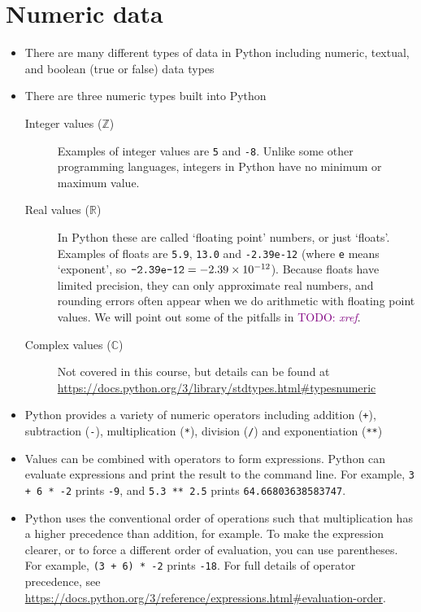\documentclass[a4paper,twoside]{memoir}
\newcommand{\shellcmd}{\texttt}
\newcommand{\TODO}[1]{\textcolor{purple}{TODO: \emph{#1}}}
\begin{document}
\section{Numeric data}
\begin{itemize}
\item There are many different types of data in Python including numeric, textual, and boolean (true or false) data types
\item There are three numeric types built into Python
	\begin{description}
	\item[Integer values ($\mathbb{Z}$)]{Examples of integer values are \shellcmd{5} and \shellcmd{-8}.  Unlike some other programming languages, integers in Python have no minimum or maximum value.}
	\item[Real values ($\mathbb{R}$)]{In Python these are called `floating point' numbers, or just `floats'.  Examples of floats are \shellcmd{5.9}, \shellcmd{13.0} and \shellcmd{-2.39e-12} (where \shellcmd{e} means `exponent', so $\text{\shellcmd{-2.39e-12}} = \num{-2.39e-12}$).  Because floats have limited precision, they can only approximate real numbers, and rounding errors often appear when we do arithmetic with floating point values.  We will point out some of the pitfalls in \TODO{xref}.}
	\item[Complex values ($\mathbb{C}$)]{Not covered in this course, but details can be found at \url{https://docs.python.org/3/library/stdtypes.html#typesnumeric}}
	\end{description}
\item Python provides a variety of numeric operators including addition (\shellcmd{+}), subtraction (\shellcmd{-}), multiplication (\shellcmd{*}), division (\shellcmd{/}) and exponentiation (\shellcmd{**})
\item Values can be combined with operators to form expressions.  Python can evaluate expressions and print the result to the command line.  For example, \shellcmd{3 + 6 * -2} prints \shellcmd{-9}, and \shellcmd{5.3 ** 2.5} prints \shellcmd{64.66803638583747}.
\item Python uses the conventional order of operations such that multiplication has a higher precedence than addition, for example.  To make the expression clearer, or to force a different order of evaluation, you can use parentheses.  For example, \shellcmd{(3 + 6) * -2} prints \shellcmd{-18}.  For full details of operator precedence, see \url{https://docs.python.org/3/reference/expressions.html#evaluation-order}.
\end{itemize}
\end{document}
